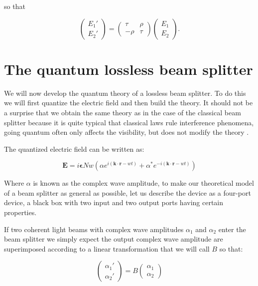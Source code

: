 \documentclass{book}
\begin{document}
so that

\begin{equation}
\begin{pmatrix} E_{1}' \\ E_{2}' \end{pmatrix}=\begin{pmatrix} \tau & \rho \\ -\rho & \tau \end{pmatrix} \begin{pmatrix} E_{1} \\ E_{2} \end{pmatrix}.
\end{equation}




\section{The quantum lossless beam splitter}

We will now develop the quantum theory of a lossless beam splitter. To do this we will first quantize the electric field and then build the theory. It should not be a surprise that we obtain the same theory as in the case of the classical beam splitter because it is quite typical that classical laws rule interference phenomena, going quantum often only affects the visibility, but does not modify the theory \cite{Leonhardt_2003}.


The quantized electric field can be written as:

\begin{equation}
\mathbf{E}=i \mathbf{\epsilon}N w \left( \alpha e^{i (\mathbf{k \cdot r}-w t)}+\alpha^{*} e^{-i (\mathbf{k \cdot r}-w t)} \right)
\end{equation}

Where $\alpha$ is known as the complex wave amplitude, to make our theoretical model of a beam splitter as general as possible, let us describe the device as a four-port device, a black box with two input and two output ports having certain properties.

If two coherent light beams with complex wave amplitudes $\alpha_{1}$ and $\alpha_{2}$ enter the beam splitter we simply expect the output complex wave amplitude  are superimposed according to a linear transformation that we will call $B$ so that:

\begin{equation}
\begin{pmatrix} \alpha_{1}' \\ \alpha_{2}' \end{pmatrix}=B\begin{pmatrix} \alpha_{1} \\ \alpha_{2} \end{pmatrix}
\end{equation}
\end{document}
